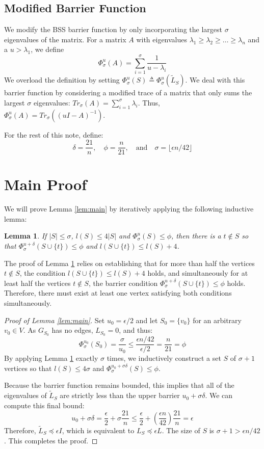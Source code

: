\documentclass[12pt]{article}
\newtheorem{lemma}{Lemma}
\begin{document}
\subsection{Modified Barrier Function}
We modify the BSS barrier function by only incorporating the largest $\sigma$ eigenvalues of the matrix. For a matrix $A$ with eigenvalues $\lambda_1 \ge \lambda_2 \ge \dots \ge \lambda_n$ and a $u > \lambda_1$, we define
\[
\Phi_\sigma^u(A) = \sum_{i=1}^\sigma \frac{1}{u - \lambda_i}
\]
We overload the definition by setting $\Phi_\sigma^u(S) \triangleq \Phi_\sigma^u(\tilde{L}_S)$. We deal with this barrier function by considering a modified trace of a matrix that only sums the largest $\sigma$ eigenvalues: $Tr_\sigma(A) = \sum_{i=1}^\sigma \lambda_i$. Thus, $\Phi_\sigma^u(A) = Tr_\sigma((uI - A)^{-1})$.

For the rest of this note, define:
\[
\delta = \frac{21}{n}, \quad \phi = \frac{n}{21}, \quad \text{and} \quad \sigma = \lfloor \epsilon n / 42 \rfloor
\]

\section{Main Proof}

We will prove Lemma \ref{lem:main} by iteratively applying the following inductive lemma:

\begin{lemma} \label{lem:inductive}
If $|S| \le \sigma$, $l(S) \le 4|S|$ and $\Phi_\sigma^u(S) \le \phi$, then there is a $t \notin S$ so that $\Phi_\sigma^{u+\delta}(S \cup \{t\}) \le \phi$ and $l(S \cup \{t\}) \le l(S) + 4$.
\end{lemma}

The proof of Lemma \ref{lem:inductive} relies on establishing that for more than half the vertices $t \notin S$, the condition $l(S \cup \{t\}) \le l(S) + 4$ holds, and simultaneously for at least half the vertices $t \notin S$, the barrier condition $\Phi_\sigma^{u+\delta}(S \cup \{t\}) \le \phi$ holds. Therefore, there must exist at least one vertex satisfying both conditions simultaneously.

\begin{proof}[Proof of Lemma \ref{lem:main}]
Set $u_0 = \epsilon/2$ and let $S_0 = \{v_0\}$ for an arbitrary $v_0 \in V$. As $G_{S_0}$ has no edges, $L_{S_0} = 0$, and thus:
\[
\Phi_\sigma^{u_0}(S_0) = \frac{\sigma}{u_0} \le \frac{\epsilon n / 42}{\epsilon / 2} = \frac{n}{21} = \phi
\]
By applying Lemma \ref{lem:inductive} exactly $\sigma$ times, we inductively construct a set $S$ of $\sigma + 1$ vertices so that $l(S) \le 4\sigma$ and $\Phi_\sigma^{u_0 + \sigma \delta}(S) \le \phi$. 

Because the barrier function remains bounded, this implies that all of the eigenvalues of $\tilde{L}_S$ are strictly less than the upper barrier $u_0 + \sigma \delta$. We can compute this final bound:
\[
u_0 + \sigma \delta = \frac{\epsilon}{2} + \sigma \frac{21}{n} \le \frac{\epsilon}{2} + \left(\frac{\epsilon n}{42}\right)\frac{21}{n} = \epsilon
\]
Therefore, $\tilde{L}_S \preceq \epsilon I$, which is equivalent to $L_S \preceq \epsilon L$. The size of $S$ is $\sigma + 1 > \epsilon n / 42$. This completes the proof.
\end{proof}
\end{document}
